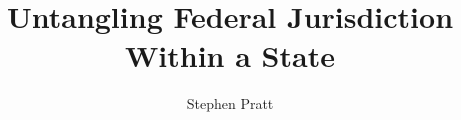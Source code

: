 \documentclass{beamer}
\newcommand*{\sectionpage}{\usebeamertemplate*{section page}}
\begin{document}
\title[Untangling Federal Jurisdiction]{Untangling Federal Jurisdiction Within a State}
\author{Stephen Pratt}

%
%
%
%
%
%
\end{document}
